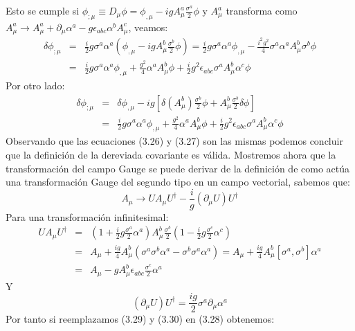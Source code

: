 Esto se cumple si $\phi_{;\mu}\equiv D_{\mu}\phi=\phi_{,\mu}-igA_{\mu}^{a}\frac{\sigma^{a}}{2}\phi$ y $A_{\mu}^{a}$ transforma como $A_{\mu}^{a}\to A_{\mu}^{a}+\partial_{\mu}\alpha^{a}-g\epsilon_{abc}\alpha^{b}A_{\mu}^{c}$, veamos:
\begin{eqnarray}
\nonumber \delta\phi_{;\mu}&=&\frac{i}{2}g\sigma^{a}\alpha^{a}(\phi_{,\mu}-igA_{\mu}^{b}\frac{\sigma^{b}}{2}\phi)=\frac{i}{2}g\sigma^{a}\alpha^{a}\phi_{,\mu}-\frac{i^{2}g^{2}}{4}\sigma^{a}\alpha^{a}A_{\mu}^{b}\sigma^{b}\phi\\
&=&\frac{i}{2}g\sigma^{a}\alpha^{a}\phi_{,\mu}+\frac{g^{2}}{4}\alpha^{a}A_{\mu}^{b}\phi+\frac{i}{2}g^{2}\epsilon_{abc}\sigma^{a}A_{\mu}^{b}\alpha^{c}\phi
\end{eqnarray}
Por otro lado:
\begin{eqnarray}
\nonumber \delta\phi_{;\mu}&=&\delta\phi_{,\mu}-ig[\delta(A_{\mu}^{b})\frac{\sigma^{b}}{2}\phi+A_{\mu}^{b}\frac{\sigma^{b}}{2}\delta\phi]\\
&=&\frac{i}{2}g\sigma^{a}\alpha^{a}\phi_{,\mu}+\frac{g^{2}}{4}\alpha^{a}A_{\mu}^{b}\phi+\frac{i}{2}g^{2}\epsilon_{abc}\sigma^{a}A_{\mu}^{b}\alpha^{c}\phi 
\end{eqnarray}
Observando que las ecuaciones (3.26) y (3.27) son las mismas podemos concluir que la definición de la dereviada covariante es válida. Mostremos ahora que la transformación del campo Gauge se puede derivar de la definición de como actúa una transformación Gauge del segundo tipo en un campo vectorial, sabemos que:
\begin{equation}
A_\mu \to UA_\mu U^\dagger -\frac{i}{g}(\partial_\mu U)U^\dagger 
\end{equation}
Para una transformación infinitesimal:
\begin{eqnarray}
\nonumber UA_\mu U^{\dagger}&=&\left(1+\frac{i}{2}g\frac{\sigma^{a}}{2}\alpha^{a}\right)A_{\mu}^{b}\frac{\sigma^{b}}{2}(1-\frac{i}{2}g\frac{\sigma^{c}}{2}\alpha^{c})\\
\nonumber &=&A_\mu+\frac{ig}{4}A_{\mu}^{b}(\sigma^{a}\sigma^{b}\alpha^{a}-\sigma^{b}\sigma^{a}\alpha^{a})=A_{\mu}+\frac{ig}{4}A_{\mu}^{b}[\sigma^{a},\sigma^{b}]\alpha^{a}\\
&=&A_{\mu}-gA_{\mu}^{b}\epsilon_{abc}\frac{\sigma^{c}}{2}\alpha^{a}
\end{eqnarray}
Y 
\begin{equation}
(\partial_\mu U)U^\dagger=\frac{ig}{2}\sigma^a\partial_\mu \alpha^a
\end{equation}
Por tanto si reemplazamos (3.29) y (3.30) en (3.28) obtenemos:
